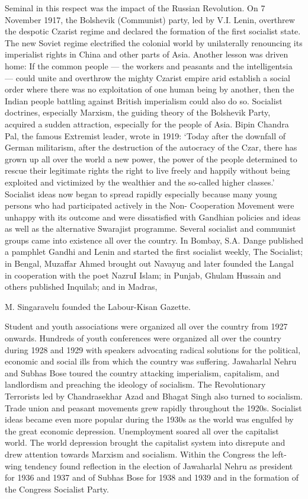 \begin{multicols}{2}
Seminal in this respect was the impact of the Russian Revolution. On 7 November 1917, the Bolshevik (Communist) party, led by V.I. Lenin, overthrew the despotic Czarist regime and declared the formation of the first socialist state. The new Soviet regime electrified the colonial world by unilaterally renouncing its imperialist rights in China and other parts of Asia. Another lesson was driven home: If the common people --- the workers and peasants and the intelligentsia --- could unite and overthrow the mighty Czarist empire arid establish a social order where there was no exploitation of one human being by another, then the Indian people battling against British imperialism could also do so. Socialist doctrines, especially Marxism, the guiding theory of the Bolshevik Party, acquired a sudden attraction, especially for the people of Asia. Bipin Chandra Pal, the famous Extremist leader, wrote in 1919: `Today after the downfall of German militarism, after the destruction of the autocracy of the Czar, there has grown up all over the world a new power, the power of the people determined to rescue their legitimate rights the right to live freely and happily without being exploited and victimized by the wealthier and the so-called higher classes.' Socialist ideas now began to spread rapidly especially because many young persons who had participated actively in the Non- Cooperation Movement were unhappy with its outcome and were dissatisfied with Gandhian policies and ideas as well as the alternative Swarajist programme. Several socialist and communist groups came into existence all over the country. In Bombay, S.A. Dange published a pamphlet Gandhi and Lenin and started the first socialist weekly, The Socialist; in Bengal, Muzaffar Ahmed brought out Navayug and later founded the Langal in cooperation with the poet NazruI Islam; in Punjab, Ghulam Hussain and others published Inquilab; and in Madras, 

M. Singaravelu founded the Labour-Kisan Gazette. 

Student and youth associations were organized all over the country from 1927 onwards. Hundreds of youth conferences were organized all over the country during 1928 and 1929 with speakers advocating radical solutions for the political, economic and social ills from which the country was suffering. Jawaharlal Nehru and Subhas Bose toured the country attacking imperialism, capitalism, and landlordism and preaching the ideology of socialism. The Revolutionary Terrorists led by Chandrasekhar Azad and Bhagat Singh also turned to socialism. Trade union and peasant movements grew rapidly throughout the 1920s. Socialist ideas became even more popular during the 1930s as the world was engulfed by the great economic depression. Unemployment soared all over the capitalist world. The world depression brought the capitalist system into disrepute and drew attention towards Marxism and socialism. Within the Congress the left-wing tendency found reflection in the election of Jawaharlal Nehru as president for 1936 and 1937 and of Subhas Bose for 1938 and 1939 and in the formation of the Congress Socialist Party.


\end{multicols}
